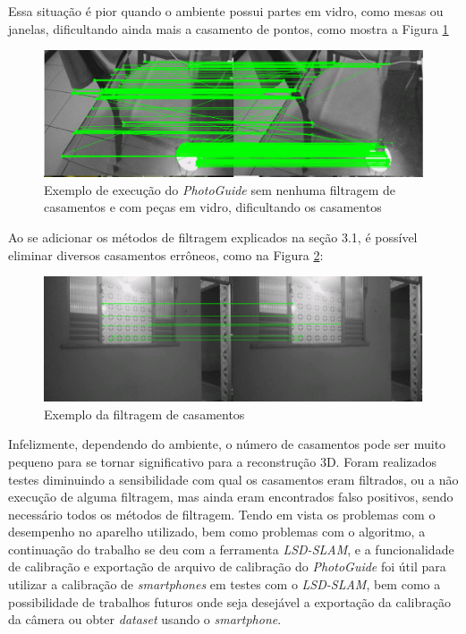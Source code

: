 Essa situação é pior quando o ambiente possui partes em vidro, como mesas ou janelas, dificultando ainda mais a casamento de pontos, como mostra a Figura \ref{fig4:3}

\begin{figure}[H]
	\centering
		\includegraphics[width= \textwidth]{Imagens/figura4-3.png}
	\caption{Exemplo de execução do \textit{PhotoGuide} sem nenhuma filtragem de casamentos e com peças em vidro, dificultando os casamentos}
	\label{fig4:3}
\end{figure}

Ao se adicionar os métodos de filtragem explicados na seção 3.1, é possível eliminar diversos casamentos errôneos, como na Figura \ref{fig4:4}:

\begin{figure}[H]
	\centering
		\includegraphics[width= \textwidth]{Imagens/figura3-2E4-4.png}
	\caption{Exemplo da filtragem de casamentos}
	\label{fig4:4}
\end{figure}

Infelizmente, dependendo do ambiente, o número de casamentos pode ser muito pequeno para se tornar significativo para a reconstrução 3D. Foram realizados testes diminuindo a sensibilidade com qual os casamentos eram filtrados, ou a não execução de alguma filtragem, mas ainda eram encontrados falso positivos, sendo necessário todos os métodos de filtragem. 
	Tendo em vista os problemas com o desempenho no aparelho utilizado, bem como problemas com o algoritmo, a continuação do trabalho se deu com a ferramenta \textit{LSD-SLAM}, e a funcionalidade de calibração e exportação de arquivo de calibração do \textit{PhotoGuide} foi útil para utilizar a calibração de \textit{smartphones} em testes com o \textit{LSD-SLAM}, bem como a possibilidade de trabalhos futuros onde seja desejável a exportação da calibração da câmera ou obter \textit{dataset} usando o \textit{smartphone}.
	
